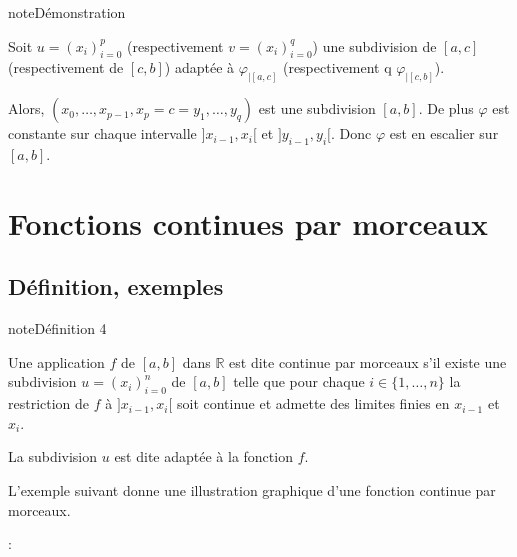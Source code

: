 \documentclass[letterpaper,10pt,french]{jupyterBook}
\let\sphinxpxdimen\pdfpxdimen\else\newdimen\sphinxpxdimen
\begin{document}
\begin{sphinxadmonition}{note}{Démonstration}
\begin{itemize}
\end{itemize}

\sphinxAtStartPar
Soit \(u=(x_i)_{i=0}^p\) (respectivement \(v= (x_i)_{i=0}^q\)) une subdivision de \([a, c]\) (respectivement de \([c, b]\)) adaptée à \(\varphi_{|[a, c]}\) (respectivement q \(\varphi_{|[c, b]}\)).

\sphinxAtStartPar
Alors, \((x_0, \ldots, x_{p-1}, x_p=c=y_1, \ldots, y_q)\) est une subdivision \([a, b]\). De plus \(\varphi\) est constante sur chaque intervalle \(]x_{i-1}, x_{i}[\) et \(]y_{i-1}, y_{i}[\). Donc \(\varphi\) est en escalier sur \([a, b]\).
\end{sphinxadmonition}


\section{Fonctions continues par morceaux}
\label{\detokenize{fcm:fonctions-continues-par-morceaux}}\label{\detokenize{fcm::doc}}

\subsection{Définition, exemples}
\label{\detokenize{fcm:definition-exemples}}
\begin{sphinxadmonition}{note}{Définition 4}

\sphinxAtStartPar
Une application \(f\) de \([a, b]\) dans \(\mathbb{R}\) est dite continue par morceaux s’il existe une subdivision \(u=(x_i)_{i=0}^n\) de \([a, b]\) telle que pour chaque \(i \in \{1,\ldots, n\}\) la restriction de \(f\) à \(]x_{i-1}, x_i[\) soit continue et admette des limites finies en \(x_{i-1}\) et \(x_{i}\).
\end{sphinxadmonition}

\sphinxAtStartPar
La subdivision \(u\) est dite adaptée à la fonction \(f\).

\sphinxAtStartPar
L’exemple suivant donne une illustration graphique d’une fonction continue par morceaux.

\sphinxAtStartPar
{}:

\noindent{\hspace*{\fill}\sphinxincludegraphics[width=500\sphinxpxdimen]{{fig1}.PNG}\hspace*{\fill}}
\end{document}
